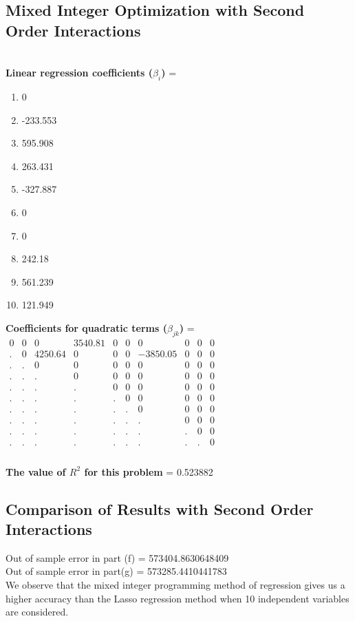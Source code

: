 \documentclass[15pt,a4paper,openright]{article}
\begin{document}
\subsection{Mixed Integer Optimization with Second Order Interactions}
\\\textbf{Linear regression coefficients ($\beta_{i}$)} =
\begin{enumerate}
   \item 0
\item -233.553
\item 595.908
\item 263.431
\item -327.887 
\item 0
\item 0
\item 242.18 
\item 561.239
\item 121.949
\end{enumerate}
\textbf{Coefficients for quadratic terms ($\beta_{jk}$)} = 
\\$\begin{matrix}
0&0&0&3540.81&0&0&0&0&0&0\\
.&0&4250.64&0&0&0&-3850.05&0&0&0\\
.&.&0&0&0&0&0&0&0&0\\
.&.&.&0&0&0&0&0&0&0\\
.&.&.&.&0&0&0&0&0&0\\
.&.&.&.&.&0&0&0&0&0\\
.&.&.&.&.&.&0&0&0&0\\
.&.&.&.&.&.&.&0&0&0\\
.&.&.&.&.&.&.&.&0&0\\
.&.&.&.&.&.&.&.&.&0\\
\end{matrix}$
\\\\\textbf{The value of $R^{2}$ for this problem} = 0.523882

\newpage{}
\subsection{Comparison of Results with Second Order Interactions}
Out of sample error in part (f) = 573404.8630648409
\\Out of sample error in part(g) = 573285.4410441783
\\We observe that the mixed integer programming method of regression gives us a higher accuracy than the Lasso regression method when 10 independent variables are considered.
\end{document}
